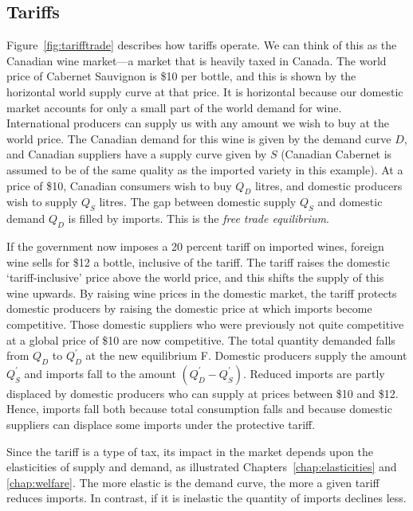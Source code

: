 \subsection*{Tariffs}

Figure~\ref{fig:tarifftrade} describes how tariffs operate. We can think of this as the Canadian wine market---a market that is heavily taxed in Canada. The world price of Cabernet Sauvignon is \$10 per bottle, and this is shown by the horizontal world supply curve at that price. It is horizontal because our domestic market accounts for only a small part of the world demand for wine. International producers can supply us with any amount we wish to buy at the world price. The Canadian demand for this wine is given by the demand curve $D$, and Canadian suppliers have a supply curve given by $S$ (Canadian Cabernet is assumed to be of the same quality as the imported variety in this example). At a price of \$10, Canadian consumers wish to buy $Q_D$ litres, and domestic producers wish to supply $Q_S$ litres. The gap between domestic supply $Q_S$ and domestic demand $Q_D$ is filled by imports. This is the \textit{free trade equilibrium}.



If the government now imposes a 20 percent tariff on imported wines, foreign wine sells for \$12 a bottle, inclusive of the tariff. The tariff raises the domestic `tariff-inclusive' price above the world price, and this shifts the supply of this wine upwards. By raising wine prices in the domestic market, the tariff protects domestic producers by raising the domestic price at which imports become competitive. Those domestic suppliers who were previously not quite competitive at a global price of \$10 are now competitive. The total quantity demanded falls from $Q_D$ to $Q_D^{'}$ at the new equilibrium F. Domestic producers supply the amount $Q_S^{'}$ and imports fall to the amount $(Q_D^{'}-Q_S^{'})$. Reduced imports are partly displaced by domestic producers who can supply at prices between \$10 and \$12. Hence, imports fall both because total consumption falls and because domestic suppliers can displace some imports under the protective tariff.

Since the tariff is a type of tax, its impact in the market depends upon the elasticities of supply and demand, as illustrated Chapters~\ref{chap:elasticities} and \ref{chap:welfare}. The more elastic is the demand curve, the more a given tariff reduces imports. In contrast, if it is inelastic the quantity of imports declines less.

